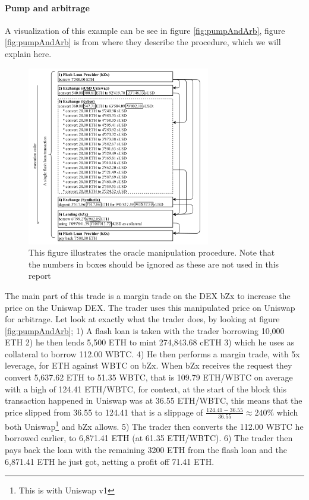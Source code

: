 \paragraph{Pump and arbitrage} A visualization of this example can be
see in figure \ref{fig:pumpAndArb}, figure \ref{fig:pumpAndArb} is
from \cite{attack} where they describe the procedure, which we will
explain here.
\begin{figure}
  \centering
  \includegraphics[width=8cm]{assests/oracle}
  \caption{This figure illustrates the oracle manipulation
    procedure. Note that the numbers in boxes should be ignored as
    these are not used in this report \cite[p. 6 fig. 7]{attack}}
  \label{fig:oracle}
\end{figure}
The main part of this trade is a margin trade on the DEX bZx to
increase the price on the Uniswap DEX. The trader uses this
manipulated price on Uniswap for arbitrage. Let look at exactly what
the trader does, by looking at figure \ref{fig:pumpAndArb}; 1) A flash
loan is taken with the trader borrowing 10,000 ETH 2) he then lends
5,500 ETH to mint 274,843.68 cETH 3) which he uses as collateral to
borrow 112.00 WBTC. 4) He then performs a margin trade, with 5x
leverage, for ETH against WBTC on bZx. When bZx receives the request
they convert 5,637.62 ETH to 51.35 WBTC, that is 109.79 ETH/WBTC on
average with a high of 124.41 ETH/WBTC, for context, at the start of
the block this transaction happened in Uniswap was at 36.55 ETH/WBTC,
this means that the price slipped from 36.55 to 124.41 that is a
slippage of $\frac{124.41-36.55}{36.55}\approx 240\%$ which both
Uniswap\footnote{This is with Uniswap v1} and bZx allows. 5) The
trader then converts the 112.00 WBTC he borrowed earlier, to 6,871.41
ETH (at 61.35 ETH/WBTC). 6) The trader then pays back the loan with
the remaining 3200 ETH from the flash loan and the 6,871.41 ETH he
just got, netting a profit off 71.41 ETH.


